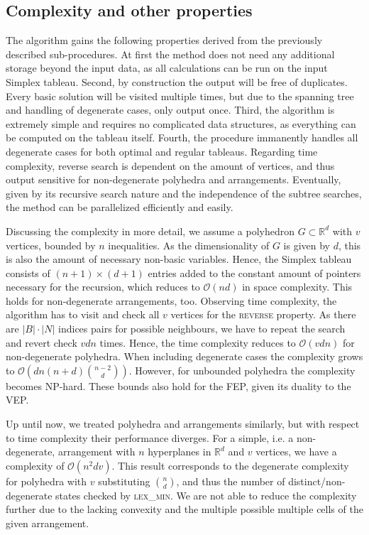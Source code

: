 \documentclass[a4paper, 11pt]{article}
\begin{document}
\subsection{Complexity and other properties}
The algorithm gains the following properties derived from the previously described sub-procedures. At first the method does not need any additional storage beyond the input data, as all calculations can be run on the input Simplex tableau. Second, by construction the output will be free of duplicates. Every basic solution will be visited multiple times, but due to the spanning tree and handling of degenerate cases, only output once. Third, the algorithm is extremely simple and requires no complicated data structures, as everything can be computed on the tableau itself. Fourth, the procedure immanently handles all degenerate cases for both optimal and regular tableaus. Regarding time complexity, reverse search is dependent on the amount of vertices, and thus output sensitive for non-degenerate polyhedra and arrangements.
Eventually, given by its recursive search nature and the independence of the subtree searches, the method can be parallelized efficiently and easily.\medskip

Discussing the complexity in more detail, we assume a polyhedron $G\subset\mathbb{R}^d$ with $v$ vertices, bounded by $n$ inequalities. As the dimensionality of $G$ is given by $d$, this is also the amount of necessary non-basic variables. Hence, the Simplex tableau consists of $(n+1)\times (d+1)$ entries added to the constant amount of pointers necessary for the recursion, which reduces to $\mathcal{O}(nd)$ in space complexity. This holds for non-degenerate arrangements, too.\medskip
Observing time complexity, the algorithm has to visit and check all $v$ vertices for the \textsc{reverse} property. As there are $|B|\cdot|N|$ indices pairs for  possible neighbours, we have to repeat the search and revert check $vdn$ times. Hence, the time complexity reduces to $\mathcal{O}(vdn)$ for non-degenerate polyhedra. When including degenerate cases the complexity grows to $\mathcal{O}\left( dn(n+d){n-2\choose d} \right)$. However, for unbounded polyhedra the complexity becomes NP-hard. These bounds also hold for the FEP, given its duality to the VEP.\medskip

Up until now, we treated polyhedra and arrangements similarly, but with respect to time complexity their performance diverges. For a simple, i.e. a non-degenerate, arrangement with $n$ hyperplanes in $\mathbb{R}^d$ and $v$ vertices, we have a complexity of $\mathcal{O}(n^2dv)$. This result corresponds to the degenerate complexity for polyhedra with $v$ substituting ${n\choose d}$, and thus the number of distinct/non-degenerate states checked by \textsc{lex\_min}. We are not able to reduce the complexity further due to the lacking convexity and the multiple possible multiple cells of the given arrangement.
\end{document}
